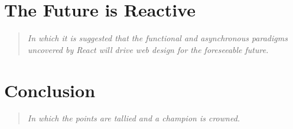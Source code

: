 \documentclass[12pt,letterpaper]{article}
\begin{document}
\section{The Future is Reactive}
\vspace{-12pt}

\begin{quote}
	\singlespacing
	\emph{In which it is suggested that the functional and asynchronous paradigms uncovered by React will drive web design for the foreseeable future.}
\end{quote}




















\section{Conclusion}
\vspace{-12pt}

\begin{quote}
	\singlespacing
	\emph{In which the points are tallied and a champion is crowned.}
\end{quote}



\end{document}
